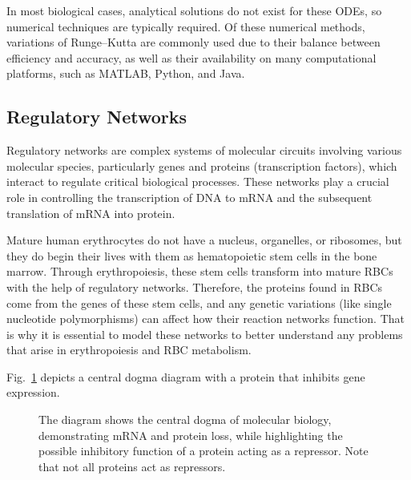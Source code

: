 \documentclass[conference]{IEEEtran}
\begin{document}
In most biological cases, analytical solutions do not exist for these ODEs, so numerical techniques are typically required\cite{b4, b5}. Of these numerical methods, variations of Runge–Kutta are commonly used due to their balance between efficiency and accuracy, as well as their availability on many computational platforms, such as MATLAB, Python, and Java\cite{b4, b6, b7, b8, b9}.

\subsection{Regulatory Networks}

Regulatory networks are complex systems of molecular circuits involving various molecular species, particularly genes and proteins (transcription factors), which interact to regulate critical biological processes. These networks play a crucial role in controlling the transcription of DNA to mRNA and the subsequent translation of mRNA into protein\cite{b10}.

Mature human erythrocytes do not have a nucleus, organelles, or ribosomes, but they do begin their lives with them as hematopoietic stem cells in the bone marrow\cite{b11}. Through erythropoiesis, these stem cells transform into mature RBCs with the help of regulatory networks. Therefore, the proteins found in RBCs come from the genes of these stem cells, and any genetic variations (like single nucleotide polymorphisms) can affect how their reaction networks function\cite{b12, b13, b14}. That is why it is essential to model these networks to better understand any problems that arise in erythropoiesis and RBC metabolism.

Fig.~\ref{fig1} depicts a central dogma diagram with a protein that inhibits gene expression.
\begin{figure}[htbp]
  \raggedleft
  \caption{The diagram shows the central dogma of molecular biology, demonstrating mRNA and protein loss, while highlighting the possible inhibitory function of a protein acting as a repressor. Note that not all proteins act as repressors.}
  \label{fig1}
\end{figure}
\end{document}
